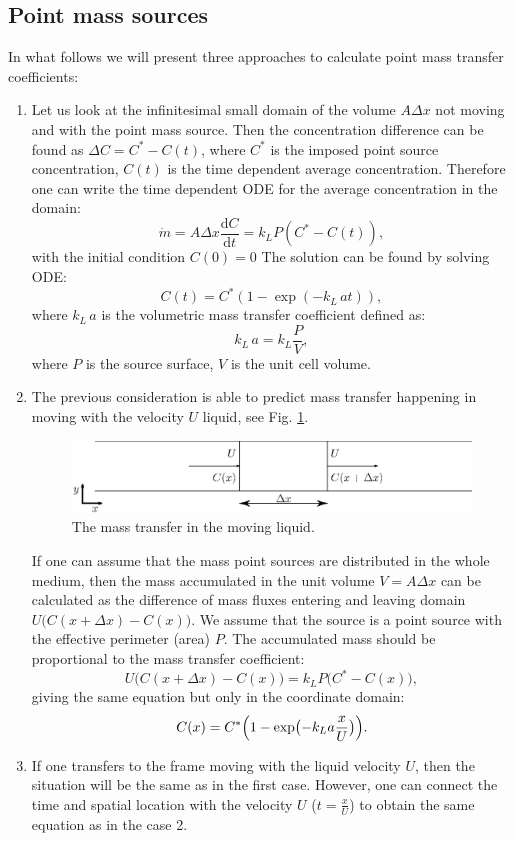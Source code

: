 \documentclass{article}
\newcommand{\beq}{\begin{equation}}
\newcommand{\feq}{\end{equation}}
\newcommand{\vol}{k_L\,a}
\newcommand{\cstar}{C^{*}}
\begin{document}
\subsection{Point mass sources}
In what follows we will present three approaches to calculate point mass transfer
coefficients:
\begin{enumerate}
\item
Let us look at the infinitesimal small domain of the volume $A \Delta x$ not
moving and with the point mass source. Then the concentration difference can be found as $\Delta C =
\cstar -
C(t)$, where $\cstar$ is the imposed point source concentration, $C(t)$ is
the time dependent average concentration. Therefore one can write the time dependent ODE for the
average concentration in the domain:
\beq
\dot{m}= A \Delta x \frac{\mathrm{d}C}{\mathrm{d} t} = k_L P (\cstar-C(t)), 
\feq
with the initial condition $C(0)=0$
The solution can be found by solving ODE:
\beq
C(t)= \cstar (1-\exp(-\vol t )), 
\feq
where $\vol$ is the volumetric mass transfer coefficient defined as:
\beq
\vol=k_L \frac{P}{V},
\feq
where $P$ is the source surface, $V$ is the unit cell volume.
\item
The previous consideration is able to predict mass transfer happening in moving with the velocity
$U$ liquid, see Fig. \ref{fig:moving:frame}. 
\begin{figure}[htb!]
\includegraphics[width=\textwidth]{Figures/mass_transfer.eps}
\caption{The mass transfer in the moving liquid. \label{fig:moving:frame}}
\end{figure}

If one can assume that the mass point sources are distributed in the whole medium, then the mass accumulated in the unit volume $V=A \Delta x$ can be calculated as the difference of 
mass fluxes entering and leaving domain $U \bigl(C(x+\Delta x)-C(x)\bigr)$. We assume that the
source is a point source with the effective perimeter (area) $P$. The accumulated mass should be proportional
to the mass transfer coefficient:
\beq
U \bigl(C(x+\Delta x)-C(x)\bigr)=k_L P \bigl(\cstar-C(x)\bigr), 
\feq 
giving the same equation but only in the coordinate domain:
\beq
C(x)= \cstar \Bigl(1-\exp\bigl(-k_L a \frac{x}{U} \bigr)\Bigr).
\label{main:mass:transfer:expression} 
\feq

\item If one transfers to the frame moving with the liquid velocity $U$, then the situation will be
the same as in the first case. However, one can connect the time and spatial location with the
velocity $U$ ($t=\frac{x}{U}$) to obtain the same equation as in the case 2.
\end{enumerate}
\end{document}
